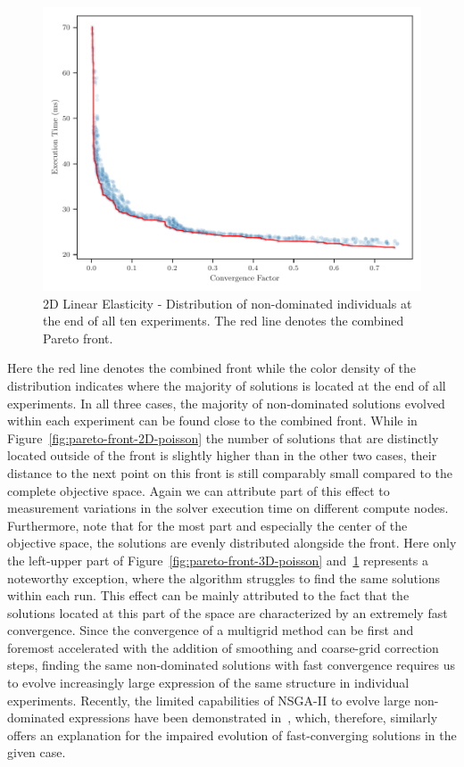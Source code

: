 \begin{figure}
	\includegraphics[width=\columnwidth]{figures/pareto_front_2D_FD_LinearElasticity_fromL2.pdf}
	\caption{2D Linear Elasticity - Distribution of non-dominated individuals at the end of all ten experiments. The red line denotes the combined Pareto front.}
	\label{fig:pareto-front-2D-linear-elasticity}
\end{figure}
Here the red line denotes the combined front while the color density of the distribution indicates where the majority of solutions is located at the end of all experiments. 
In all three cases, the majority of non-dominated solutions evolved within each experiment can be found close to the combined front.
While in Figure~\ref{fig:pareto-front-2D-poisson} the number of solutions that are distinctly located outside of the front is slightly higher than in the other two cases, their distance to the next point on this front is still comparably small compared to the complete objective space.
Again we can attribute part of this effect to measurement variations in the solver execution time on different compute nodes.
Furthermore, note that for the most part and especially the center of the objective space, the solutions are evenly distributed alongside the front.
Here only the left-upper part of Figure~\ref{fig:pareto-front-3D-poisson} and~\ref{fig:pareto-front-2D-linear-elasticity} represents a noteworthy exception, where the algorithm struggles to find the same solutions within each run.
This effect can be mainly attributed to the fact that the solutions located at this part of the space are characterized by an extremely fast convergence.
Since the convergence of a multigrid method can be first and foremost accelerated with the addition of smoothing and coarse-grid correction steps, finding the same non-dominated solutions with fast convergence requires us to evolve increasingly large expression of the same structure in individual experiments.
Recently, the limited capabilities of NSGA-II to evolve large non-dominated expressions have been demonstrated in~\cite{liu2022evolvability}, which, therefore, similarly offers an explanation for the impaired evolution of fast-converging solutions in the given case.

